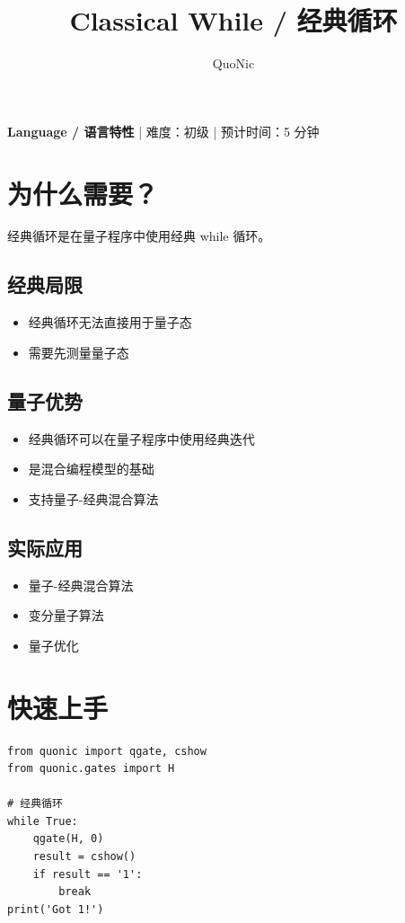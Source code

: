 \documentclass[12pt,a4paper]{article}
\title{Classical While / 经典循环}
\author{QuoNic}
\date{}
\begin{document}
\maketitle

\begin{center}
\textbf{Language / 语言特性} | 难度：初级 | 预计时间：5 分钟
\end{center}

\tableofcontents
\newpage

\section{为什么需要？}

经典循环是在量子程序中使用经典 while 循环。

\subsection{经典局限}
\begin{itemize}
  \item 经典循环无法直接用于量子态
  \item 需要先测量量子态
\end{itemize}

\subsection{量子优势}
\begin{itemize}
  \item 经典循环可以在量子程序中使用经典迭代
  \item 是混合编程模型的基础
  \item 支持量子-经典混合算法
\end{itemize}

\subsection{实际应用}
\begin{itemize}
  \item 量子-经典混合算法
  \item 变分量子算法
  \item 量子优化
\end{itemize}

\section{快速上手}

\begin{verbatim}
from quonic import qgate, cshow
from quonic.gates import H

# 经典循环
while True:
    qgate(H, 0)
    result = cshow()
    if result == '1':
        break
print('Got 1!')
\end{verbatim}
\end{document}
